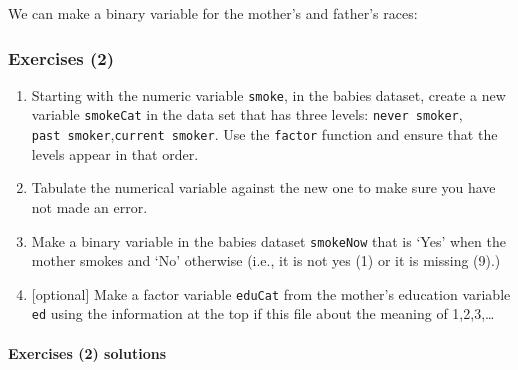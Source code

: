 \documentclass[
]{book}
\newenvironment{Shaded}{\begin{snugshade}}{\end{snugshade}}
\newcommand{\FunctionTok}[1]{\textcolor[rgb]{0.00,0.00,0.00}{#1}}
\newcommand{\NormalTok}[1]{#1}
\newcommand{\OtherTok}[1]{\textcolor[rgb]{0.56,0.35,0.01}{#1}}
\newcommand{\SpecialCharTok}[1]{\textcolor[rgb]{0.00,0.00,0.00}{#1}}
\newcommand{\StringTok}[1]{\textcolor[rgb]{0.31,0.60,0.02}{#1}}
\providecommand{\tightlist}{%
  \setlength{\itemsep}{0pt}\setlength{\parskip}{0pt}}
\begin{document}
We can make a binary variable for the mother's and father's races:

\begin{Shaded}
\end{Shaded}

\hypertarget{exercises-2}{%
\subsubsection*{Exercises (2)}\label{exercises-2}}

\begin{enumerate}
\def\labelenumi{\arabic{enumi}.}
\tightlist
\item
  Starting with the numeric variable \texttt{smoke}, in the babies dataset, create a new variable \texttt{smokeCat} in the data set that has three levels: \texttt{never\ smoker}, \texttt{past\ smoker},\texttt{current\ smoker}. Use the \texttt{factor} function and ensure that the levels appear in that order.
\item
  Tabulate the numerical variable against the new one to make sure you have not made an error.
\item
  Make a binary variable in the babies dataset \texttt{smokeNow} that is `Yes' when the mother smokes and `No' otherwise (i.e., it is not yes (1) or it is missing (9).)
\item
  {[}optional{]} Make a factor variable \texttt{eduCat} from the mother's education variable \texttt{ed} using the information at the top if this file about the meaning of 1,2,3,\ldots{}
\end{enumerate}

\hypertarget{exercises-2-solutions}{%
\paragraph*{Exercises (2) solutions}\label{exercises-2-solutions}}
\end{document}
